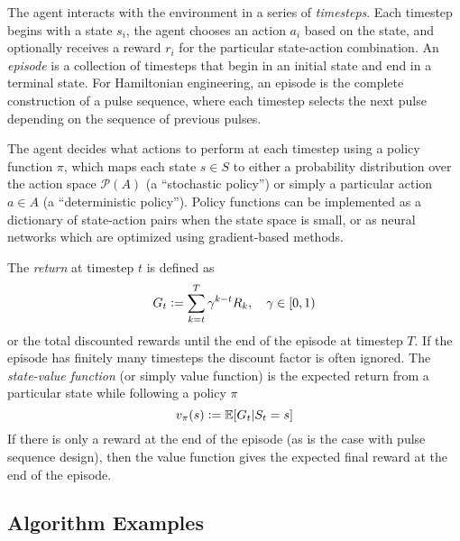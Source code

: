 The agent interacts with the environment in a series of \emph{timesteps}. Each timestep begins with a state $s_i$, the agent chooses an action $a_i$ based on the state, and optionally receives a reward $r_i$ for the particular state-action combination. An \emph{episode} is a collection of timesteps that begin in an initial state and end in a terminal state. For Hamiltonian engineering, an episode is the complete construction of a pulse sequence, where each timestep selects the next pulse depending on the sequence of previous pulses.

The agent decides what actions to perform at each timestep using a policy function $\pi$, which maps each state $s \in S$ to either a probability distribution over the action space $\mathcal{P}(A)$ (a ``stochastic policy'') or simply a particular action $a \in A$ (a ``deterministic policy''). Policy functions can be implemented as a dictionary of state-action pairs when the state space is small, or as neural networks which are optimized using gradient-based methods.

The \emph{return} at timestep $t$ is defined as
\begin{equation}\label{eq:return}
    G_t \mathrel{\mathop:}= \sum_{k=t}^T \gamma^{k-t} R_k, \quad \gamma \in [0,1)
\end{equation}
or the total discounted rewards until the end of the episode at timestep $T$. If the episode has finitely many timesteps the discount factor is often ignored. The \emph{state-value function} (or simply value function) is the expected return from a particular state while following a policy $\pi$
\begin{equation}\label{eq:state_value}
    v_\pi(s) \mathrel{\mathop:}= \mathbb E[G_t | S_t = s]
\end{equation}
If there is only a reward at the end of the episode (as is the case with pulse sequence design), then the value function gives the expected final reward at the end of the episode.



\subsection{Algorithm Examples}

